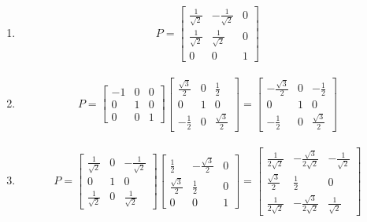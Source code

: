 \begin{Answer}
\begin{enumerate}[label=(\alph*)]
\item \begin{align*}
P = \begin{bmatrix}
\frac{1}{\sqrt{2}} & -\frac{1}{\sqrt{2}} & 0\\
\frac{1}{\sqrt{2}} & \frac{1}{\sqrt{2}} & 0\\
0 & 0 & 1
\end{bmatrix}
\end{align*}
\item 
\begin{align*}
P =
\begin{bmatrix}
-1 & 0 & 0\\
0 & 1 & 0\\
0 & 0 & 1    
\end{bmatrix}
\begin{bmatrix}
\frac{\sqrt{3}}{2} & 0 & \frac{1}{2}\\
0 & 1 & 0\\
-\frac{1}{2} & 0 & \frac{\sqrt{3}}{2}
\end{bmatrix}
=
\begin{bmatrix}
-\frac{\sqrt{3}}{2} & 0 & -\frac{1}{2}\\
0 & 1 & 0\\
-\frac{1}{2} & 0 & \frac{\sqrt{3}}{2}
\end{bmatrix}
\end{align*}
\item
\begin{align*}
P =
\begin{bmatrix}
\frac{1}{\sqrt{2}} & 0 & -\frac{1}{\sqrt{2}}\\
0 & 1 & 0\\
\frac{1}{\sqrt{2}} & 0 & \frac{1}{\sqrt{2}}
\end{bmatrix}
\begin{bmatrix}
\frac{1}{2} & -\frac{\sqrt{3}}{2} & 0\\
\frac{\sqrt{3}}{2} & \frac{1}{2} & 0\\
0 & 0 & 1
\end{bmatrix}
=
\begin{bmatrix}
\frac{1}{2\sqrt{2}}&-\frac{\sqrt{3}}{2\sqrt{2}}&-\frac{1}{\sqrt{2}}\\ 
\frac{\sqrt{3}}{2}&\frac{1}{2}&0\\ 
\frac{1}{2\sqrt{2}}&-\frac{\sqrt{3}}{2\sqrt{2}}&\frac{1}{\sqrt{2}}
\end{bmatrix}
\end{align*}
\end{enumerate}
\end{Answer}

